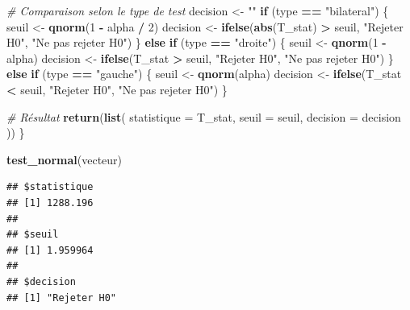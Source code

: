 \documentclass[
  12pt,
]{article}
\newenvironment{Shaded}{\begin{snugshade}}{\end{snugshade}}
\newcommand{\AttributeTok}[1]{\textcolor[rgb]{0.13,0.29,0.53}{#1}}
\newcommand{\CommentTok}[1]{\textcolor[rgb]{0.56,0.35,0.01}{\textit{#1}}}
\newcommand{\ControlFlowTok}[1]{\textcolor[rgb]{0.13,0.29,0.53}{\textbf{#1}}}
\newcommand{\DecValTok}[1]{\textcolor[rgb]{0.00,0.00,0.81}{#1}}
\newcommand{\FunctionTok}[1]{\textcolor[rgb]{0.13,0.29,0.53}{\textbf{#1}}}
\newcommand{\NormalTok}[1]{#1}
\newcommand{\OtherTok}[1]{\textcolor[rgb]{0.56,0.35,0.01}{#1}}
\newcommand{\SpecialCharTok}[1]{\textcolor[rgb]{0.81,0.36,0.00}{\textbf{#1}}}
\newcommand{\StringTok}[1]{\textcolor[rgb]{0.31,0.60,0.02}{#1}}
\begin{document}
\begin{Shaded}
\begin{Highlighting}[]
  \CommentTok{\# Comparaison selon le type de test}
\NormalTok{  decision }\OtherTok{\textless{}{-}} \StringTok{""}
  \ControlFlowTok{if}\NormalTok{ (type }\SpecialCharTok{==} \StringTok{"bilateral"}\NormalTok{) \{}
\NormalTok{    seuil }\OtherTok{\textless{}{-}} \FunctionTok{qnorm}\NormalTok{(}\DecValTok{1} \SpecialCharTok{{-}}\NormalTok{ alpha }\SpecialCharTok{/} \DecValTok{2}\NormalTok{)}
\NormalTok{    decision }\OtherTok{\textless{}{-}} \FunctionTok{ifelse}\NormalTok{(}\FunctionTok{abs}\NormalTok{(T\_stat) }\SpecialCharTok{\textgreater{}}\NormalTok{ seuil, }\StringTok{"Rejeter H0"}\NormalTok{, }\StringTok{"Ne pas rejeter H0"}\NormalTok{)}
\NormalTok{  \} }\ControlFlowTok{else} \ControlFlowTok{if}\NormalTok{ (type }\SpecialCharTok{==} \StringTok{"droite"}\NormalTok{) \{}
\NormalTok{    seuil }\OtherTok{\textless{}{-}} \FunctionTok{qnorm}\NormalTok{(}\DecValTok{1} \SpecialCharTok{{-}}\NormalTok{ alpha)}
\NormalTok{    decision }\OtherTok{\textless{}{-}} \FunctionTok{ifelse}\NormalTok{(T\_stat }\SpecialCharTok{\textgreater{}}\NormalTok{ seuil, }\StringTok{"Rejeter H0"}\NormalTok{, }\StringTok{"Ne pas rejeter H0"}\NormalTok{)}
\NormalTok{  \} }\ControlFlowTok{else} \ControlFlowTok{if}\NormalTok{ (type }\SpecialCharTok{==} \StringTok{"gauche"}\NormalTok{) \{}
\NormalTok{    seuil }\OtherTok{\textless{}{-}} \FunctionTok{qnorm}\NormalTok{(alpha)}
\NormalTok{    decision }\OtherTok{\textless{}{-}} \FunctionTok{ifelse}\NormalTok{(T\_stat }\SpecialCharTok{\textless{}}\NormalTok{ seuil, }\StringTok{"Rejeter H0"}\NormalTok{, }\StringTok{"Ne pas rejeter H0"}\NormalTok{)}
\NormalTok{  \}}
  
  \CommentTok{\# Résultat}
  \FunctionTok{return}\NormalTok{(}\FunctionTok{list}\NormalTok{(}
    \AttributeTok{statistique =}\NormalTok{ T\_stat,}
    \AttributeTok{seuil =}\NormalTok{ seuil,}
    \AttributeTok{decision =}\NormalTok{ decision}
\NormalTok{  ))}
\NormalTok{\}}
\end{Highlighting}
\end{Shaded}

\begin{Shaded}
\begin{Highlighting}[]
\FunctionTok{test\_normal}\NormalTok{(vecteur)}
\end{Highlighting}
\end{Shaded}

\begin{verbatim}
## $statistique
## [1] 1288.196
## 
## $seuil
## [1] 1.959964
## 
## $decision
## [1] "Rejeter H0"
\end{verbatim}
\end{document}
